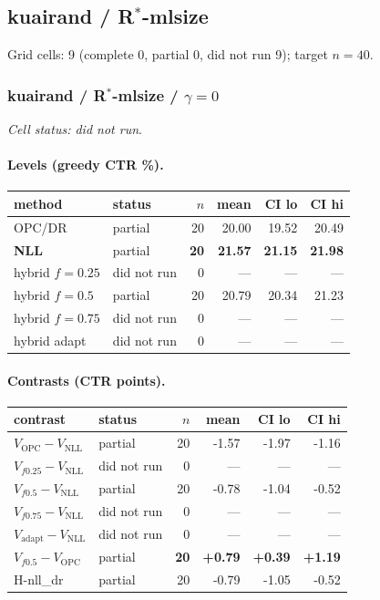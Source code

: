 \documentclass[10pt,a4paper]{article}
\begin{document}
\subsection{kuairand / R$^*$-mlsize}
Grid cells: 9 (complete 0, partial 0, did not run 9); target $n=40$.
\subsubsection{kuairand / R$^*$-mlsize / $\gamma=0$}
\emph{Cell status: did not run}.
\paragraph{Levels (greedy CTR \%).}
{\centering\small\begin{tabular}{llrrrr}
\toprule method & status & $n$ & mean & CI lo & CI hi \\
\midrule
OPC/DR & partial & 20 & 20.00 & 19.52 & 20.49 \\
\textbf{NLL} & partial & \textbf{20} & \textbf{21.57} & \textbf{21.15} & \textbf{21.98} \\
hybrid $f{=}0.25$ & did not run & 0 & --- & --- & --- \\
hybrid $f{=}0.5$ & partial & 20 & 20.79 & 20.34 & 21.23 \\
hybrid $f{=}0.75$ & did not run & 0 & --- & --- & --- \\
hybrid adapt & did not run & 0 & --- & --- & --- \\
\bottomrule\end{tabular}\par}
\paragraph{Contrasts (CTR points).}
{\centering\small\begin{tabular}{llrrrr}
\toprule contrast & status & $n$ & mean & CI lo & CI hi \\
\midrule
$V_{\mathrm{OPC}}-V_{\mathrm{NLL}}$ & partial & 20 & -1.57 & -1.97 & -1.16 \\
$V_{f0.25}-V_{\mathrm{NLL}}$ & did not run & 0 & --- & --- & --- \\
$V_{f0.5}-V_{\mathrm{NLL}}$ & partial & 20 & -0.78 & -1.04 & -0.52 \\
$V_{f0.75}-V_{\mathrm{NLL}}$ & did not run & 0 & --- & --- & --- \\
$V_{\mathrm{adapt}}-V_{\mathrm{NLL}}$ & did not run & 0 & --- & --- & --- \\
\textbf{$V_{f0.5}-V_{\mathrm{OPC}}$} & partial & \textbf{20} & \textbf{+0.79} & \textbf{+0.39} & \textbf{+1.19} \\
H-nll\_dr & partial & 20 & -0.79 & -1.05 & -0.52 \\
\bottomrule\end{tabular}\par}
\bigskip
\end{document}

